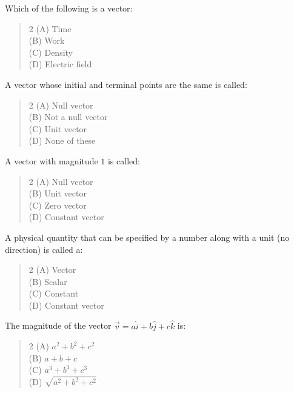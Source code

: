 \documentclass[11pt,a4paper]{article}
\begin{document}
\begin{mcqlist}
\item Which of the following is a vector:
\begin{quote}\begin{multicols}{2}
\noindent (A) Time \\
(B) Work \\
(C) Density \\
(D) Electric field
\end{multicols}\end{quote}

\item A vector whose initial and terminal points are the same is called:
\begin{quote}\begin{multicols}{2}
\noindent (A) Null vector \\
(B) Not a null vector \\
(C) Unit vector \\
(D) None of these
\end{multicols}\end{quote}

\item A vector with magnitude $1$ is called:
\begin{quote}\begin{multicols}{2}
\noindent (A) Null vector \\
(B) Unit vector \\
(C) Zero vector \\
(D) Constant vector
\end{multicols}\end{quote}

\item A physical quantity that can be specified by a number along with a unit (no direction) is called a:
\begin{quote}\begin{multicols}{2}
\noindent (A) Vector \\
(B) Scalar \\
(C) Constant \\
(D) Constant vector
\end{multicols}\end{quote}

\item The magnitude of the vector $\vec{v}=a\hat{i}+b\hat{j}+c\hat{k}$ is:
\begin{quote}\begin{multicols}{2}
\noindent (A) $a^2+b^2+c^2$ \\
(B) $a+b+c$ \\
(C) $a^3+b^3+c^3$ \\
(D) $\sqrt{a^2+b^2+c^2}$
\end{multicols}\end{quote}


\end{mcqlist}
\end{document}
